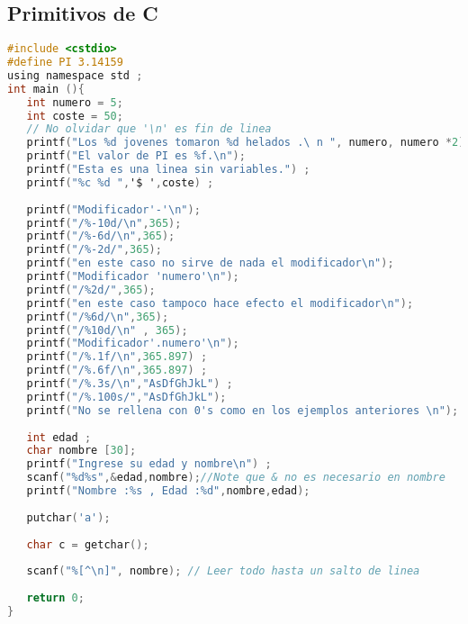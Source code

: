 \subsection{Primitivos de C}
\begin{lstlisting}[language=C]
#include <cstdio>
#define PI 3.14159
using namespace std ;
int main (){
   int numero = 5;
   int coste = 50;
   // No olvidar que '\n' es fin de linea
   printf("Los %d jovenes tomaron %d helados .\ n ", numero, numero *2);
   printf("El valor de PI es %f.\n");
   printf("Esta es una linea sin variables.") ;
   printf("%c %d ",'$ ',coste) ;
   
   printf("Modificador'-'\n");
   printf("/%-10d/\n",365);
   printf("/%-6d/\n",365);
   printf("/%-2d/",365);
   printf("en este caso no sirve de nada el modificador\n");
   printf("Modificador 'numero'\n");
   printf("/%2d/",365);
   printf("en este caso tampoco hace efecto el modificador\n");
   printf("/%6d/\n",365);
   printf("/%10d/\n" , 365);
   printf("Modificador'.numero'\n");
   printf("/%.1f/\n",365.897) ;
   printf("/%.6f/\n",365.897) ;
   printf("/%.3s/\n","AsDfGhJkL") ;
   printf("/%.100s/","AsDfGhJkL");
   printf("No se rellena con 0's como en los ejemplos anteriores \n");
   
   int edad ;
   char nombre [30];
   printf("Ingrese su edad y nombre\n") ;
   scanf("%d%s",&edad,nombre);//Note que & no es necesario en nombre
   printf("Nombre :%s , Edad :%d",nombre,edad);
   
   putchar('a');
   
   char c = getchar();
   
   scanf("%[^\n]", nombre); // Leer todo hasta un salto de linea
   
   return 0;
}
\end{lstlisting}

